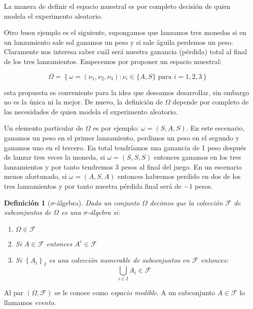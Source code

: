 \documentclass{extreport}
\theoremstyle{definicion}
\newtheorem{definition}{Definición}[chapter]
\theoremstyle{propiedad}
\begin{document}
  

La manera de definir el espacio muestral es por completo decisión de quien modela el experimento aleatorio.  

Otro buen ejemplo es el siguiente, supongamos que lanzamos tres monedas si en un lanzamiento sale sol ganamos un peso y si sale águila perdemos un peso. Claramente nos interesa saber cuál será nuestra ganancia (pérdida) total al final de los tres lanzamientos. Empecemos por proponer un espacio muestral:

$$
\Omega = \left\{\omega = (\nu_1, \nu_2, \nu_3): \nu_i \in\{A,S\}\text{ para } i = 1,2,3 \right\}
$$

esta propuesta es conveniente para la idea que deseamos desarrollar, sin embargo no es la única ni la mejor. De nuevo, la definición de $\Omega$ depende por completo de las necesidades de quien modela el experimento aleatorio.

Un elemento particular de $\Omega$ es por ejemplo: $\omega = (S,A,S)$. En este escenario, ganamos un peso en el primer lanzamiento, perdimos un peso en el segundo y ganamos uno en el tercero. En total tendríamos una ganancia de 1 peso después de lanzar tres veces la moneda,  si  $\omega = (S,S,S)$ entonces ganamos en los tres lanzamientos y por tanto tendremos 3 pesos al final del juego. En un escenario menos afortunado, si $\omega = (A,S,A)$ entonces habremos perdido en dos de los tres lanzamientos y por tanto nuestra pérdida final será de $-1$ pesos. 



\begin{definition}[$\sigma$-álgebra]
    Dado un conjunto $\Omega$ decimos que la colección $\mathcal{F}$ de subconjuntos de $\Omega$ es una $\sigma$-\emph{álgebra} si:
    \begin{enumerate}
        \item $\Omega \in \mathcal{F}$
        \item Si $A\in \mathcal{F}$ entonces $A^c \in \mathcal{F}$
        \item Si $\left\{A_i\right\}_{I}$ es una colección numerable de subconjuntos en $\mathcal{F}$ entonces:
        $$
            \bigcup_{i\in I} A_i \in \mathcal{F}
        $$
    \end{enumerate}
\end{definition}
\par\noindent
Al par $(\Omega, \mathcal{F})$  se le conoce como \emph{espacio medible}. A un subconjunto $A\in \mathcal{F}$ lo llamamos \emph{evento}.
\end{document}

